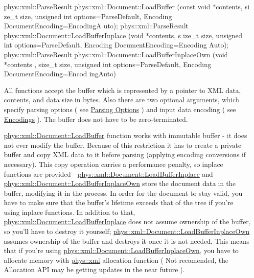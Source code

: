 \begin{DoxyCode}
 phys::xml::ParseResult phys::xml::Document::LoadBuffer (const void *contents, si
      ze_t size, unsigned int options=ParseDefault, Encoding DocumentEncoding=EncodingA
      uto);
 phys::xml::ParseResult phys::xml::Document::LoadBufferInplace (void *contents, s
      ize_t size, unsigned int options=ParseDefault, Encoding DocumentEncoding=Encoding
      Auto);
 phys::xml::ParseResult phys::xml::Document::LoadBufferInplaceOwn (void *contents
      , size_t size, unsigned int options=ParseDefault, Encoding DocumentEncoding=Encod
      ingAuto)
\end{DoxyCode}
 All functions accept the buffer which is represented by a pointer to XML data, contents, and data size in bytes. Also there are two optional arguments, which specify parsing options ( see \hyperlink{XMLManual_XMLLoadingParsingOptions}{Parsing Options} ) and input data encoding ( see \hyperlink{XMLManual_XMLLoadingEncodings}{Encodings} ). The buffer does not have to be zero-\/terminated. \par
 \par
 \hyperlink{classphys_1_1xml_1_1Document_a31c36783e033d6d43d51e31a6dd4099f}{phys::xml::Document::LoadBuffer} function works with immutable buffer -\/ it does not ever modify the buffer. Because of this restriction it has to create a private buffer and copy XML data to it before parsing (applying encoding conversions if necessary). This copy operation carries a performance penalty, so inplace functions are provided -\/ \hyperlink{classphys_1_1xml_1_1Document_ad1dd510bd1106edb92c69715eb015dc3}{phys::xml::Document::LoadBufferInplace} and \hyperlink{classphys_1_1xml_1_1Document_a9213b8bf4fa5423ea292a3d03c826608}{phys::xml::Document::LoadBufferInplaceOwn} store the document data in the buffer, modifying it in the process. In order for the document to stay valid, you have to make sure that the buffer's lifetime exceeds that of the tree if you're using inplace functions. In addition to that, \hyperlink{classphys_1_1xml_1_1Document_ad1dd510bd1106edb92c69715eb015dc3}{phys::xml::Document::LoadBufferInplace} does not assume ownership of the buffer, so you'll have to destroy it yourself; \hyperlink{classphys_1_1xml_1_1Document_a9213b8bf4fa5423ea292a3d03c826608}{phys::xml::Document::LoadBufferInplaceOwn} assumes ownership of the buffer and destroys it once it is not needed. This means that if you're using \hyperlink{classphys_1_1xml_1_1Document_a9213b8bf4fa5423ea292a3d03c826608}{phys::xml::Document::LoadBufferInplaceOwn}, you have to allocate memory with \hyperlink{namespacephys_1_1xml}{phys::xml} allocation function ( Not recomended, the Allocation API may be getting updates in the near future ). \par

